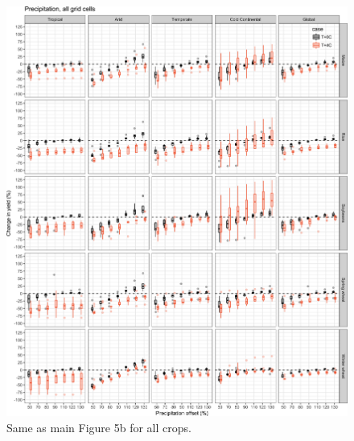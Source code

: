 \documentclass[10pt]{article}
\begin{document}
\begin{figure}[h!]
\centering
\includegraphics[width=\textwidth]{s_sim_CG_W.png}
\caption{Same as main Figure 5b for all crops.}
\label{fig:water}
\end{figure}
\end{document}
